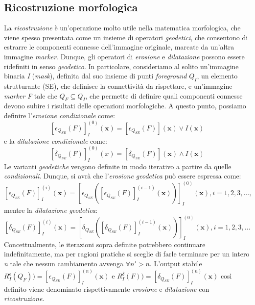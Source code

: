 \subsection{Ricostruzione morfologica}
\label{subsec:math-morph-reconstruction}
La \textit{ricostruzione} \`e un'operazione molto utile nella matematica morfologica, che viene spesso presentata come un insieme di operatori \textit{geodetici}, che consentono di estrarre le componenti connesse dell'immagine originale, marcate da un'altra immagine \textit{marker}. Dunque, gli operatori di \textit{erosione} e \textit{dilatazione} possono essere ridefiniti in senso \textit{geodetico}. In particolare, consideriamo al solito un'immagine binaria \textit{I} (\textit{mask}), definita dal suo insieme di punti \textit{foreground} $Q_{I}$, un elemento strutturante (SE), che definisce la connettivit\`a da rispettare, e un'immagine \textit{marker} \textit{F} tale che $Q_{F} \subseteq Q_{I}$, che permette di definire quali componenti connesse devono subire i risultati delle operazioni morfologiche. A questo punto, possiamo definire l'\textit{erosione condizionale} come:
\begin{equation}
	\label{eq:conditional-erosion}
	[\epsilon_{Q_{SE}}(F)]^{(0)}_{I}(\textbf{x}) = [\epsilon_{Q_{SE}}(F)](\textbf{x}) \vee I(\textbf{x})
\end{equation}
e la \textit{dilatazione condizionale} come:
\begin{equation}
	\label{eq:conditional-dilation}
	[\delta_{Q_{SE}}(F)]^{(0)}_{I}(x) = [\delta_{Q_{SE}}(F)](\textbf{x}) \wedge I(\textbf{x})
\end{equation}
Le varianti \textit{geodetiche} vengono definite in modo iterativo a partire da quelle \textit{condizionali}. Dunque, si avr\`a che l'\textit{erosione geodetica} pu\`o essere espressa come:
\begin{equation}
	\label{eq:geodesic-erosion}
	[\epsilon_{Q_{SE}}(F)]^{(i)}_{I}(\textbf{x}) = [\epsilon_{Q_{SE}}([\epsilon_{Q_{SE}}(F)]^{(i-1)}_{I}(\textbf{x}))]^{(0)}_{I}(\textbf{x}), i=1,2,3,\dots,
\end{equation}
mentre la \textit{dilatazione geodetica}:
\begin{equation}
	\label{eq:geodesic-dilation}
	[\delta_{Q_{SE}}(F)]^{(i)}_{I}(\textbf{x}) = [\delta_{Q_{SE}}([\delta_{Q_{SE}}(F)]^{(i-1)}_{I}(\textbf{x}))]^{(0)}_{I}(\textbf{x}), i=1,2,3,\dots
\end{equation}
Concettualmente, le iterazioni sopra definite potrebbero continuare indefinitamente, ma per ragioni pratiche si sceglie di farle terminare per un intero \textit{n} tale che nessun cambiamento avvenga $\forall n' > n$. L'output stabile $R^{\epsilon}_{I}(Q_{F}))=[\epsilon_{Q_{SE}}(F)]^{(n)}_{I}(\textbf{x})$ e $R^{\delta}_{I}(F))=[\delta_{Q_{SE}}(F)]^{(n)}_{I}(\textbf{x})$ cos\`i definito viene denominato rispettivamente \textit{erosione} e \textit{dilatazione} con \textit{ricostruzione}.
